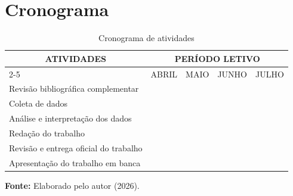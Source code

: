 \newpage

\section[CRONOGRAMA]{Cronograma}

\begin{table}[H]
    \centering
    \caption{Cronograma de atividades}
    \label{tab:cronograma}
    \renewcommand{\arraystretch}{1.5} %
    \begin{tabularx}{\textwidth}{|X|c|c|c|c|}
        \hline
        \multicolumn{1}{|c|}{\multirow{2}{*}{ATIVIDADES}} & \multicolumn{4}{c|}{PERÍODO LETIVO} \\ \cline{2-5}
        \multicolumn{1}{|c|}{} & ABRIL & MAIO & JUNHO & JULHO \\ \hline
        
        Revisão bibliográfica complementar & \cellcolor{gray!60} & \cellcolor{gray!60} & \cellcolor{gray!60} &  \\ \hline
        
        Coleta de dados & \cellcolor{gray!60} & \cellcolor{gray!60} &  &  \\ \hline
        
        Análise e interpretação dos dados & \cellcolor{gray!60} & \cellcolor{gray!60} &  &  \\ \hline
        
        Redação do trabalho & \cellcolor{gray!60} & \cellcolor{gray!60} &  &  \\ \hline
        
        Revisão e entrega oficial do trabalho &  &  & \cellcolor{gray!60} &  \\ \hline
        
        Apresentação do trabalho em banca &  &  &  & \cellcolor{gray!60} \\ \hline
    \end{tabularx}
    \vspace{0.2cm} %
    
    {\raggedright \small \textbf{Fonte:} Elaborado pelo autor (2026).\par}
\end{table}